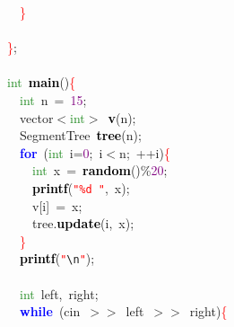 {{\mbox{}\ \ \textcolor{Red}{\}} \\
\mbox{} \\
\mbox{}\textcolor{Red}{\}}\textcolor{BrickRed}{;} \\
\mbox{} \\
\mbox{}\textcolor{ForestGreen}{int}\ \textbf{\textcolor{Black}{main}}\textcolor{BrickRed}{()}\textcolor{Red}{\{} \\
\mbox{}\ \ \textcolor{ForestGreen}{int}\ n\ \textcolor{BrickRed}{=}\ \textcolor{Purple}{15}\textcolor{BrickRed}{;} \\
\mbox{}\ \ vector\textcolor{BrickRed}{$<$}\textcolor{ForestGreen}{int}\textcolor{BrickRed}{$>$}\ \textbf{\textcolor{Black}{v}}\textcolor{BrickRed}{(}n\textcolor{BrickRed}{);} \\
\mbox{}\ \ SegmentTree\ \textbf{\textcolor{Black}{tree}}\textcolor{BrickRed}{(}n\textcolor{BrickRed}{);} \\
\mbox{}\ \ \textbf{\textcolor{Blue}{for}}\ \textcolor{BrickRed}{(}\textcolor{ForestGreen}{int}\ i\textcolor{BrickRed}{=}\textcolor{Purple}{0}\textcolor{BrickRed}{;}\ i\textcolor{BrickRed}{$<$}n\textcolor{BrickRed}{;}\ \textcolor{BrickRed}{++}i\textcolor{BrickRed}{)}\textcolor{Red}{\{} \\
\mbox{}\ \ \ \ \textcolor{ForestGreen}{int}\ x\ \textcolor{BrickRed}{=}\ \textbf{\textcolor{Black}{random}}\textcolor{BrickRed}{()\%}\textcolor{Purple}{20}\textcolor{BrickRed}{;} \\
\mbox{}\ \ \ \ \textbf{\textcolor{Black}{printf}}\textcolor{BrickRed}{(}\texttt{\textcolor{Red}{"{}\%d\ "{}}}\textcolor{BrickRed}{,}\ x\textcolor{BrickRed}{);} \\
\mbox{}\ \ \ \ v\textcolor{BrickRed}{[}i\textcolor{BrickRed}{]}\ \textcolor{BrickRed}{=}\ x\textcolor{BrickRed}{;} \\
\mbox{}\ \ \ \ tree\textcolor{BrickRed}{.}\textbf{\textcolor{Black}{update}}\textcolor{BrickRed}{(}i\textcolor{BrickRed}{,}\ x\textcolor{BrickRed}{);} \\
\mbox{}\ \ \textcolor{Red}{\}} \\
\mbox{}\ \ \textbf{\textcolor{Black}{printf}}\textcolor{BrickRed}{(}\texttt{\textcolor{Red}{"{}}}\texttt{\textcolor{CarnationPink}{\textbackslash{}n}}\texttt{\textcolor{Red}{"{}}}\textcolor{BrickRed}{);} \\
\mbox{} \\
\mbox{}\ \ \textcolor{ForestGreen}{int}\ left\textcolor{BrickRed}{,}\ right\textcolor{BrickRed}{;} \\
\mbox{}\ \ \textbf{\textcolor{Blue}{while}}\ \textcolor{BrickRed}{(}cin\ \textcolor{BrickRed}{$>$$>$}\ left\ \textcolor{BrickRed}{$>$$>$}\ right\textcolor{BrickRed}{)}\textcolor{Red}{\{} \\
}}
